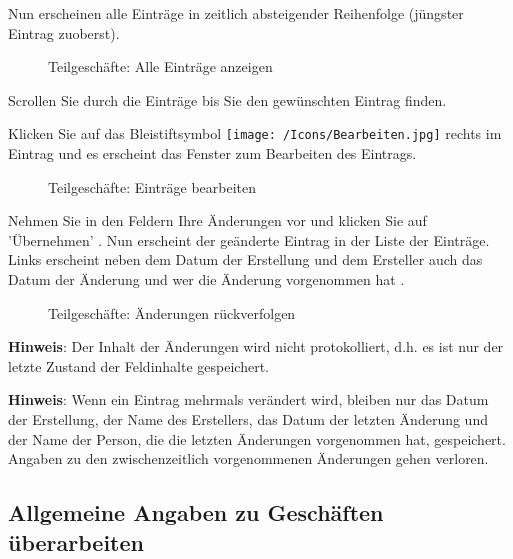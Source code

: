 Nun erscheinen alle Einträge in zeitlich absteigender Reihenfolge (jüngster Eintrag zuoberst).

\begin{figure}[H]
\caption{Teilgeschäfte: Alle Einträge anzeigen}
\end{figure}

Scrollen Sie durch die Einträge bis Sie den gewünschten Eintrag finden.

\vspace{\baselineskip}

Klicken Sie auf das Bleistiftsymbol \texttt{[image: /Icons/Bearbeiten.jpg]}  rechts im Eintrag und es erscheint das Fenster zum Bearbeiten des Eintrags.

\begin{figure}[H]
\caption{Teilgeschäfte: Einträge bearbeiten}
\end{figure}

Nehmen Sie in den Feldern Ihre Änderungen vor und klicken Sie auf 'Übernehmen' . Nun erscheint der geänderte Eintrag in der Liste der Einträge. Links erscheint neben dem Datum der Erstellung und dem Ersteller auch das Datum der Änderung und wer die Änderung vorgenommen hat .

\begin{figure}[H]
\caption{Teilgeschäfte: Änderungen rückverfolgen}
\end{figure}

\textbf{Hinweis}: Der Inhalt der Änderungen wird nicht protokolliert, d.h. es ist nur der letzte Zustand der Feldinhalte gespeichert.

\vspace{\baselineskip}

\textbf{Hinweis}: Wenn ein Eintrag mehrmals verändert wird, bleiben nur das Datum der Erstellung, der Name des Erstellers, das Datum der letzten Änderung und der Name der Person, die die letzten Änderungen vorgenommen hat, gespeichert. Angaben zu den zwischenzeitlich vorgenommenen Änderungen gehen verloren.

\subsection{Allgemeine Angaben zu Geschäften überarbeiten}

